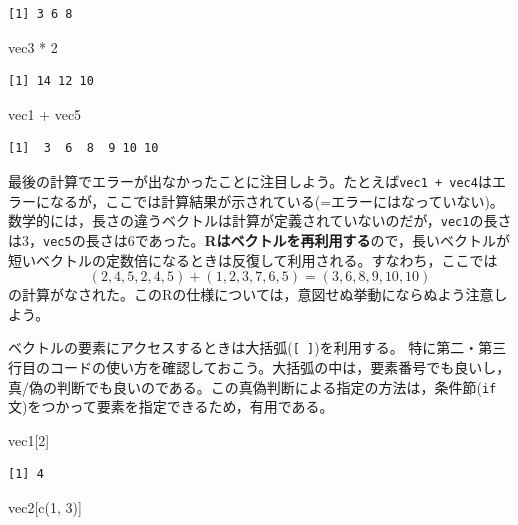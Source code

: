 \documentclass[
  a4paper,
]{ltjsbook}
\newenvironment{Shaded}{\begin{snugshade}}{\end{snugshade}}
\newcommand{\DecValTok}[1]{\textcolor[rgb]{0.68,0.00,0.00}{#1}}
\newcommand{\FunctionTok}[1]{\textcolor[rgb]{0.28,0.35,0.67}{#1}}
\newcommand{\NormalTok}[1]{\textcolor[rgb]{0.00,0.23,0.31}{#1}}
\newcommand{\SpecialCharTok}[1]{\textcolor[rgb]{0.37,0.37,0.37}{#1}}
\begin{document}
\begin{verbatim}
[1] 3 6 8
\end{verbatim}

\begin{Shaded}
\begin{Highlighting}[]
\NormalTok{vec3 }\SpecialCharTok{*} \DecValTok{2}
\end{Highlighting}
\end{Shaded}

\begin{verbatim}
[1] 14 12 10
\end{verbatim}

\begin{Shaded}
\begin{Highlighting}[]
\NormalTok{vec1 }\SpecialCharTok{+}\NormalTok{ vec5}
\end{Highlighting}
\end{Shaded}

\begin{verbatim}
[1]  3  6  8  9 10 10
\end{verbatim}

最後の計算でエラーが出なかったことに注目しよう。たとえば\texttt{vec1\ +\ vec4}はエラーになるが，ここでは計算結果が示されている(=エラーにはなっていない)。数学的には，長さの違うベクトルは計算が定義されていないのだが，\texttt{vec1}の長さは3，\texttt{vec5}の長さは6であった。\textbf{Rはベクトルを再利用する}ので，長いベクトルが短いベクトルの定数倍になるときは反復して利用される。すなわち，ここでは
\[ (2,4,5,2,4,5) + (1,2,3,7,6,5) = (3,6,8,9,10,10)\]
の計算がなされた。このRの仕様については，意図せぬ挙動にならぬよう注意しよう。

ベクトルの要素にアクセスするときは大括弧(\texttt{{[}\ {]}})を利用する。
特に第二・第三行目のコードの使い方を確認しておこう。大括弧の中は，要素番号でも良いし，真/偽の判断でも良いのである。この真偽判断による指定の方法は，条件節(\texttt{if}文)をつかって要素を指定できるため，有用である。

\begin{Shaded}
\begin{Highlighting}[]
\NormalTok{vec1[}\DecValTok{2}\NormalTok{]}
\end{Highlighting}
\end{Shaded}

\begin{verbatim}
[1] 4
\end{verbatim}

\begin{Shaded}
\begin{Highlighting}[]
\NormalTok{vec2[}\FunctionTok{c}\NormalTok{(}\DecValTok{1}\NormalTok{, }\DecValTok{3}\NormalTok{)]}
\end{Highlighting}
\end{Shaded}
\end{document}
